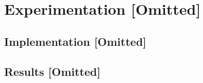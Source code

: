 \section{Experimentation [Omitted]}
\subsection{Implementation [Omitted]}
\subsection{Results [Omitted]}